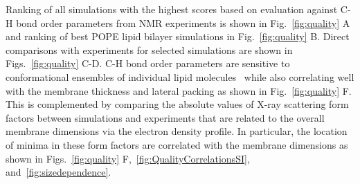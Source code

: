 \documentclass[fleqn,10pt]{wlscirep}
\begin{document}
Ranking of all simulations with the highest scores based on evaluation against C-H bond order parameters from NMR experiments is shown in Fig.~\ref{fig:quality} A and ranking of best POPE lipid bilayer simulations in Fig.~\ref{fig:quality} B. Direct comparisons with experiments for selected simulations are shown in Figs.~\ref{fig:quality} C-D. C-H bond order parameters are sensitive to conformational ensembles of individual lipid molecules~\cite{ollila16} while also correlating well with the membrane thickness and lateral packing as shown in Fig.~\ref{fig:quality} F. This is complemented by comparing the absolute values of X-ray scattering form factors between simulations and experiments that are related to the overall membrane dimensions via the electron density profile. In particular, the location of minima in these form factors are correlated with the membrane dimensions as shown in Figs.~\ref{fig:quality} F,~\ref{fig:QualityCorrelationsSI}, and~\ref{fig:sizedependence}.




\end{document}
